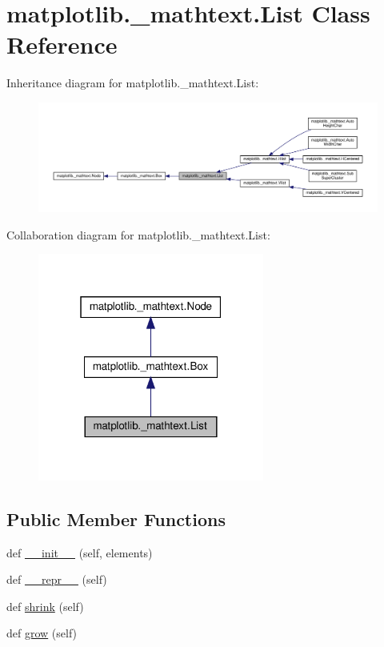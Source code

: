\hypertarget{classmatplotlib_1_1__mathtext_1_1List}{}\section{matplotlib.\+\_\+mathtext.\+List Class Reference}
\label{classmatplotlib_1_1__mathtext_1_1List}


Inheritance diagram for matplotlib.\+\_\+mathtext.\+List\+:
\nopagebreak
\begin{figure}[H]
\begin{center}
\leavevmode
\includegraphics[width=350pt]{classmatplotlib_1_1__mathtext_1_1List__inherit__graph}
\end{center}
\end{figure}


Collaboration diagram for matplotlib.\+\_\+mathtext.\+List\+:
\nopagebreak
\begin{figure}[H]
\begin{center}
\leavevmode
\includegraphics[width=211pt]{classmatplotlib_1_1__mathtext_1_1List__coll__graph}
\end{center}
\end{figure}
\subsection*{Public Member Functions}
\begin{DoxyCompactItemize}
\item 
def \hyperlink{classmatplotlib_1_1__mathtext_1_1List_af0034c8f7594a9f29db2db77776e205c}{\+\_\+\+\_\+init\+\_\+\+\_\+} (self, elements)
\item 
def \hyperlink{classmatplotlib_1_1__mathtext_1_1List_a4810ad82508c64d5d8fb8eb03ceb7762}{\+\_\+\+\_\+repr\+\_\+\+\_\+} (self)
\item 
def \hyperlink{classmatplotlib_1_1__mathtext_1_1List_a1bcf74d34e68bcec97e75d1d85bad290}{shrink} (self)
\item 
def \hyperlink{classmatplotlib_1_1__mathtext_1_1List_abced32a6828d6e4fdd843e898ed23337}{grow} (self)
\end{DoxyCompactItemize}
